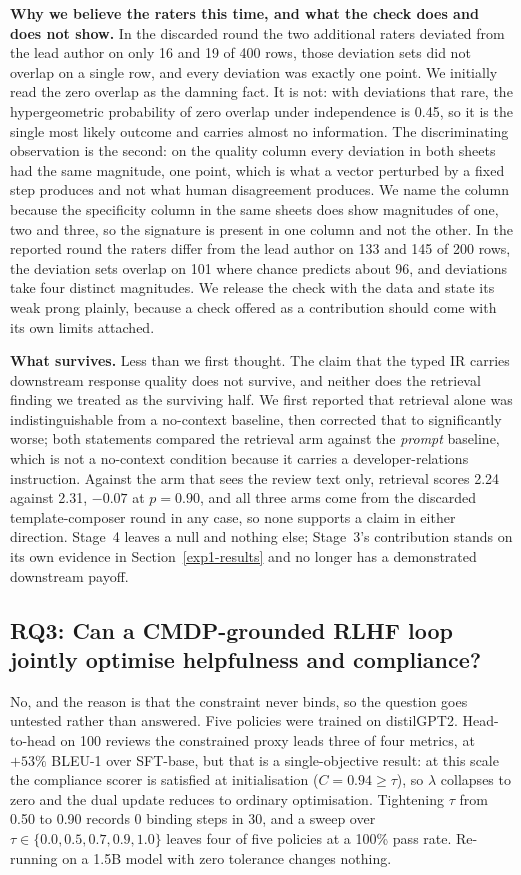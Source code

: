 \documentclass[preprint,12pt]{elsarticle}
\begin{document}
\textbf{Why we believe the raters this time, and what the check does and does not show.} In the
discarded round the two additional raters deviated from the lead author on only 16 and 19 of 400
rows, those deviation sets did not overlap on a single row, and every deviation was exactly one
point. We initially read the zero overlap as the damning fact. It is not: with deviations that
rare, the hypergeometric probability of zero overlap under independence is 0.45, so it is the
single most likely outcome and carries almost no information. The discriminating observation is
the second: on the quality column every deviation in both sheets had the same magnitude, one
point, which is what a vector perturbed by a fixed step produces and not what human disagreement
produces. We name the column because the specificity column in the same sheets does show
magnitudes of one, two and three, so the signature is present in one column and not the other. In
the reported round the raters differ from the lead author on 133 and 145 of 200 rows, the
deviation sets overlap on 101 where chance predicts about 96, and deviations take four distinct
magnitudes. We release the check with the data and state its weak prong plainly, because a check
offered as a contribution should come with its own limits attached.

\textbf{What survives.} Less than we first thought. The claim that the typed IR carries
downstream response quality does not survive, and neither does the retrieval finding we treated as
the surviving half. We first reported that retrieval alone was indistinguishable from a no-context
baseline, then corrected that to significantly worse; both statements compared the retrieval arm
against the \emph{prompt} baseline, which is not a no-context condition because it carries a
developer-relations instruction. Against the arm that sees the review text only, retrieval scores
2.24 against 2.31, $-0.07$ at $p = 0.90$, and all three arms come from the discarded
template-composer round in any case, so none supports a claim in either direction. Stage~4 leaves
a null and nothing else; Stage~3's contribution stands on its own evidence in
Section~\ref{exp1-results} and no longer has a demonstrated downstream payoff.

\subsection{RQ3: Can a CMDP-grounded RLHF loop jointly optimise helpfulness and compliance?}\label{exp3-results}
No, and the reason is that the constraint never binds, so the question goes untested rather than
answered. Five policies were trained on distilGPT2. Head-to-head on 100 reviews the constrained
proxy leads three of four metrics, at $+53\%$ BLEU-1 over SFT-base, but that is a single-objective
result: at this scale the compliance scorer is satisfied at initialisation ($C = 0.94 \geq \tau$),
so $\lambda$ collapses to zero and the dual update reduces to ordinary optimisation. Tightening
$\tau$ from 0.50 to 0.90 records 0 binding steps in 30, and a sweep over
$\tau \in \{0.0, 0.5, 0.7, 0.9, 1.0\}$ leaves four of five policies at a 100\% pass rate. Re-running
on a 1.5B model with zero tolerance changes nothing.
\end{document}

